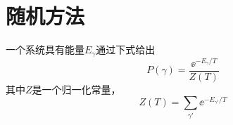 
\section{随机方法} %
一个系统具有能量$E_\gamma$通过下式给出
\[P(\gamma)=\frac{\ee^{-E_\gamma/T}}{Z(T)}\]
其中$Z$是一个归一化常量，
\[Z(T)=\sum_{\gamma'}\ee^{-E_{\gamma'}/T}\]

